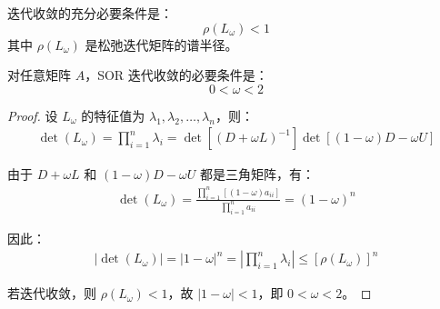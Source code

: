 迭代收敛的充分必要条件是：
\[
\rho(L_\omega) < 1
\]
其中 $\rho(L_\omega)$ 是松弛迭代矩阵的谱半径。

\begin{theorem}
    对任意矩阵 $A$，SOR 迭代收敛的必要条件是：
    \[
    0 < \omega < 2
    \]
\begin{proof}
设 $L_\omega$ 的特征值为 $\lambda_1, \lambda_2, \dots, \lambda_n$，则：
\begin{gather*}
\det(L_\omega) = \prod_{i=1}^n \lambda_i = \det[(D + \omega L)^{-1}]\det[(1 - \omega)D - \omega U]
\end{gather*}

由于 $D + \omega L$ 和 $(1 - \omega)D - \omega U$ 都是三角矩阵，有：
\begin{gather*}
\det(L_\omega) = \frac{\prod_{i=1}^n [(1 - \omega)a_{ii}]}{\prod_{i=1}^n a_{ii}} = (1 - \omega)^n
\end{gather*}

因此：
\begin{gather*}
|\det(L_\omega)| = |1 - \omega|^n = \left|\prod_{i=1}^n \lambda_i\right| \leq [\rho(L_\omega)]^n
\end{gather*}

若迭代收敛，则 $\rho(L_\omega) < 1$，故 $|1 - \omega| < 1$，即 $0 < \omega < 2$。
\end{proof}
\end{theorem}


